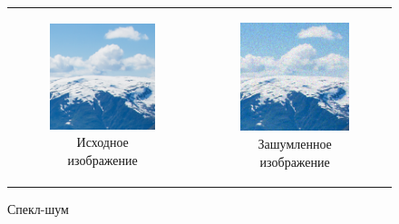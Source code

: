 \begin{figure}[h!]
  \centering
  \begin{tabular}{cc}
    \begin{subfigure}{0.45\textwidth}
      \includegraphics[width=\linewidth]{inc/analysis/noises/original.png}
      \caption{Исходное изображение}
    \end{subfigure} &
    \begin{subfigure}{0.45\textwidth}
      \includegraphics[width=\linewidth]{inc/analysis/noises/speckle.png}
      \caption{Зашумленное изображение}
    \end{subfigure} \\
  \end{tabular}
  \caption{Спекл-шум}
  \label{fig:speckle_noise}
\end{figure}

